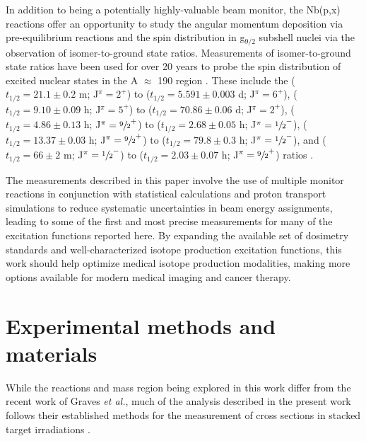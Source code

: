 \documentclass[%
 reprint,
superscriptaddress,
onecolumn,
linenumbers,
notitlepage,
 amsmath,amssymb,
 aps,
prc,
]{revtex4-1}
\newcommand{\etal}{\emph{et al.}}
\begin{document}
  
In addition to being a potentially highly-valuable beam monitor, the Nb(p,x) reactions offer an opportunity to study the angular momentum deposition via pre-equilibrium reactions and the spin distribution in g$_{9/2}$ subshell nuclei via the observation of isomer-to-ground state ratios.  
Measurements of isomer-to-ground state ratios have been used for over 20 years to probe the spin distribution of excited nuclear states in the A $\approx$ 190 region \cite{PhysRevC.73.034613,PhysRevC.45.1171}.
These include the  ($t_{1/2}=21.1\pm0.2$ m; J$^\pi=2^+$) to   ($t_{1/2}=5.591\pm0.003$ d; J$^\pi=6^+$),  ($t_{1/2}=9.10\pm0.09$ h; J$^\pi=5^+$) to   ($t_{1/2}=70.86\pm0.06$ d; J$^\pi=2^+$),   ($t_{1/2}=4.86\pm0.13$ h; J$^\pi=\sfrac{9}{2}^+$) to   ($t_{1/2}=2.68\pm0.05$ h; J$^\pi=\sfrac{1}{2}^-$),   ($t_{1/2}=13.37\pm0.03$ h; J$^\pi=\sfrac{9}{2}^+$) to   ($t_{1/2}=79.8\pm0.3$ h; J$^\pi=\sfrac{1}{2}^-$),  and  ($t_{1/2}=66\pm2$ m; J$^\pi=\sfrac{1}{2}^-$) to   ($t_{1/2}=2.03\pm0.07$ h; J$^\pi=\sfrac{9}{2}^+$)  ratios \cite{Dong2015,Nesaraja2010,Singh2014,Johnson2015,Singh2013}.  
 
 
The measurements described in this paper involve the use of multiple monitor reactions in conjunction with statistical calculations and proton transport simulations to reduce systematic uncertainties in beam energy assignments, leading to some of the first and most precise measurements  for many of the excitation functions reported here. 
By expanding the available set of dosimetry standards and well-characterized isotope production excitation functions, this work should help optimize medical isotope production modalities, making more options   available for modern medical imaging and cancer therapy.

 
 
 


\section{Experimental methods and materials}\label{sec:experiment}


While the reactions and mass region being explored in this work differ from the recent work of Graves \etal, much of the analysis described in the present work follows their established methods for the measurement of cross sections in stacked target irradiations   \cite{Graves2016}.
\end{document}
